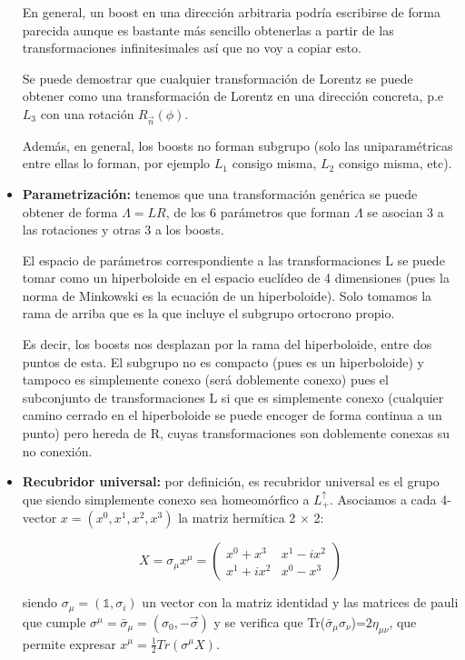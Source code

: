 \begin{itemize}
En general, un boost en una dirección arbitraria podría escribirse de forma parecida aunque es bastante más sencillo obtenerlas a partir de las transformaciones infinitesimales así que no voy a copiar esto.

\smallskip
Se puede demostrar que cualquier transformación de Lorentz se puede obtener como una transformación de Lorentz en una dirección concreta, p.e $L_3$ con una rotación $R_{\Vec{n}}(\phi)$.

\smallskip
Además, en general, los boosts no forman subgrupo (solo las uniparamétricas entre ellas lo forman, por ejemplo $L_1$ consigo misma, $L_2$ consigo misma, etc).

\item \textbf{Parametrización:} tenemos que una transformación genérica se puede obtener de forma $\Lambda =LR$, de los 6 parámetros que forman $\Lambda$ se asocian 3 a las rotaciones y otras 3 a los boosts.

\smallskip
El espacio de parámetros correspondiente a las transformaciones L se puede tomar como un hiperboloide en el espacio euclídeo de 4 dimensiones (pues la norma de Minkowski es la ecuación de un hiperboloide). Solo tomamos la rama de arriba que es la que incluye el subgrupo ortocrono propio.

\smallskip
Es decir, los boosts nos desplazan por la rama del hiperboloide, entre dos puntos de esta. El subgrupo no es compacto (pues es un hiperboloide) y tampoco es simplemente conexo (será doblemente conexo) pues el subconjunto de transformaciones L si que es simplemente conexo (cualquier camino cerrado en el hiperboloide se puede encoger de forma continua a un punto) pero hereda de R, cuyas transformaciones son doblemente conexas su no conexión.

\item\textbf{Recubridor universal:} por definición, es recubridor universal es el grupo que siendo simplemente conexo sea homeomórfico a $L_+^\uparrow$. Asociamos a cada 4-vector $x=(x^0,x^1,x^2,x^3)$ la matriz hermítica 2 $\times$ 2:

$$X=\sigma _\mu x^\mu =\left ( \begin{array}{cc}
     x^0+x^3 & x^1-ix^2 \\
     x^1+ix^2 & x^0-x^3
\end{array}\right)$$

siendo $\sigma _\mu =(\mathds{1},\sigma _i)$ un vector con la matriz identidad y las matrices de pauli que cumple $\sigma ^\mu =\bar{\sigma}_\mu =(\sigma _0 , -\Vec{\sigma})$ y se verifica que Tr($\bar{\sigma}_\mu \sigma _\nu$)=$2\eta _{\mu \nu}$, que permite expresar $x^\mu =\frac{1}{2}Tr(\sigma ^\mu X)$.


\end{itemize}
